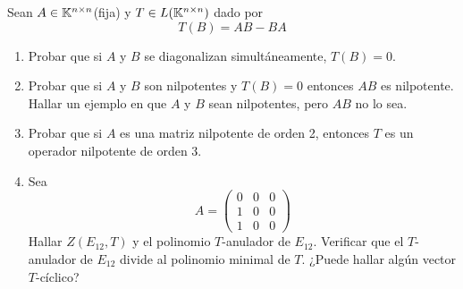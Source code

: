 \item Sean $A\in\mathbb{K}^{n\times n}$(fija) y $T\in L(\mathbb{K}^{n\times n})$ dado por \[T(B)=AB-BA\]
    \begin{enumerate}
        \item Probar que si $A$ y $B$ se diagonalizan simultáneamente, $T(B)=0$.
            \begin{mdframed}[style=s]
                
            \end{mdframed}
        \item Probar que si $A$ y $B$ son nilpotentes y $T(B)=0$ entonces $AB$ es nilpotente. Hallar un ejemplo en que $A$ y $B$ sean nilpotentes, pero $AB$ no lo sea.
            \begin{mdframed}[style=s]
                
            \end{mdframed}
        \item Probar que si $A$ es una matriz nilpotente de orden 2, entonces $T$ es un operador nilpotente de orden 3.
            \begin{mdframed}[style=s]
                
            \end{mdframed}
        \item Sea \[A=\begin{pmatrix}
                0&0&0\\1&0&0\\1&0&0
            \end{pmatrix}\]
            Hallar $Z(E_{12},T)$ y el polinomio $T$-anulador de $E_{12}$. Verificar que el $T$-anulador de $E_{12}$ divide al polinomio minimal de $T$. ¿Puede hallar algún vector $T$-cíclico?
            \begin{mdframed}[style=s]
                
            \end{mdframed}
    \end{enumerate}